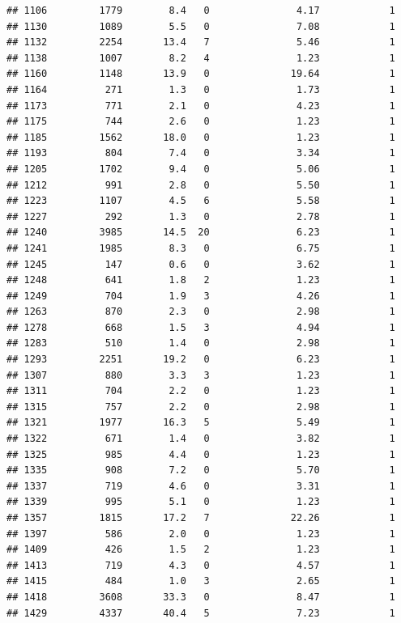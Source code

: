 \documentclass[
]{article}
\begin{document}
\begin{verbatim}
## 1106         1779        8.4   0               4.17            1
## 1130         1089        5.5   0               7.08            1
## 1132         2254       13.4   7               5.46            1
## 1138         1007        8.2   4               1.23            1
## 1160         1148       13.9   0              19.64            1
## 1164          271        1.3   0               1.73            1
## 1173          771        2.1   0               4.23            1
## 1175          744        2.6   0               1.23            1
## 1185         1562       18.0   0               1.23            1
## 1193          804        7.4   0               3.34            1
## 1205         1702        9.4   0               5.06            1
## 1212          991        2.8   0               5.50            1
## 1223         1107        4.5   6               5.58            1
## 1227          292        1.3   0               2.78            1
## 1240         3985       14.5  20               6.23            1
## 1241         1985        8.3   0               6.75            1
## 1245          147        0.6   0               3.62            1
## 1248          641        1.8   2               1.23            1
## 1249          704        1.9   3               4.26            1
## 1263          870        2.3   0               2.98            1
## 1278          668        1.5   3               4.94            1
## 1283          510        1.4   0               2.98            1
## 1293         2251       19.2   0               6.23            1
## 1307          880        3.3   3               1.23            1
## 1311          704        2.2   0               1.23            1
## 1315          757        2.2   0               2.98            1
## 1321         1977       16.3   5               5.49            1
## 1322          671        1.4   0               3.82            1
## 1325          985        4.4   0               1.23            1
## 1335          908        7.2   0               5.70            1
## 1337          719        4.6   0               3.31            1
## 1339          995        5.1   0               1.23            1
## 1357         1815       17.2   7              22.26            1
## 1397          586        2.0   0               1.23            1
## 1409          426        1.5   2               1.23            1
## 1413          719        4.3   0               4.57            1
## 1415          484        1.0   3               2.65            1
## 1418         3608       33.3   0               8.47            1
## 1429         4337       40.4   5               7.23            1

\end{verbatim}
\end{document}
